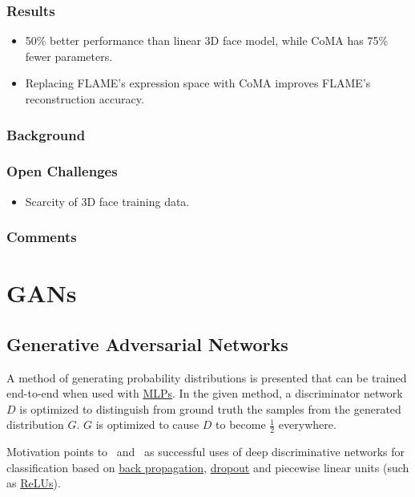 \documentclass[a4paper, 12pt]{article}
\begin{document}
\subsubsection{Results}

\begin{itemize}
\item 50\% better performance than linear 3D face model, while CoMA has 75\%
        fewer parameters.

\item Replacing FLAME's expression space with CoMA improves FLAME's
        reconstruction accuracy.
\end{itemize}


\subsubsection{Background}


\subsubsection{Open Challenges}

\begin{itemize}
\item Scarcity of 3D face training data.
\end{itemize}


\subsubsection{Comments}


\section{GANs}

\subsection{Generative Adversarial Networks\citet{NIPS2014_5423}}
\label{gan}

A method of generating probability distributions is presented that can be
trained end-to-end when used with \hyperref[multilayer_perceptron]{MLPs}. In
the given method, a discriminator network $D$ is optimized to distinguish from
ground truth the samples from the generated distribution $G$. $G$ is optimized
to cause $D$ to become $\frac{1}{2}$ everywhere.

Motivation points to~\citet{deepSpeechReviewSPM2012} and~\citet{NIPS2012_4824} as
successful uses of deep discriminative networks for classification based on
\hyperref[backprop]{back propagation}, \hyperref[dropout]{dropout} and
piecewise linear units (such as \hyperref[rectified_linear_units]{ReLUs}).
\end{document}
